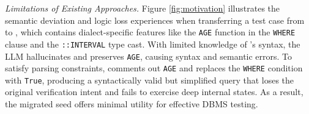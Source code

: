 \documentclass[sigconf,review,anonymous]{acmart}
\begin{document}
\textit{Limitations of Existing Approaches.} Figure \ref{fig:motivation} illustrates the semantic deviation and logic loss \sedar{} experiences when transferring a test case from \pg{} to \duckdb{}, which contains dialect-specific features like the \texttt{AGE} function in the \texttt{WHERE} clause and the \texttt{::INTERVAL} type cast. With limited knowledge of \duckdb{}’s syntax, the LLM hallucinates and preserves \texttt{AGE}, causing syntax and semantic errors. To satisfy parsing constraints, \sedar{} comments out \texttt{AGE} and replaces the \texttt{WHERE} condition with \texttt{True}, producing a syntactically valid but simplified query that loses the original verification intent and fails to exercise deep internal states. As a result, the migrated seed offers minimal utility for effective DBMS testing.





\end{document}
